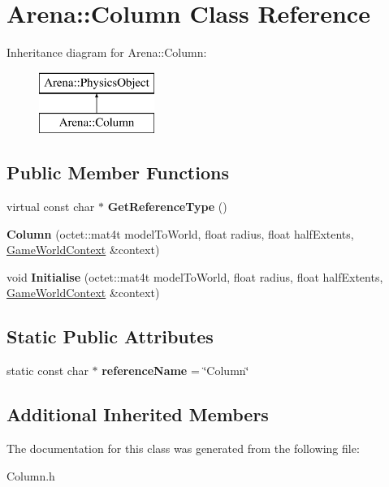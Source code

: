 \hypertarget{class_arena_1_1_column}{\section{Arena\+:\+:Column Class Reference}
\label{class_arena_1_1_column}
}
Inheritance diagram for Arena\+:\+:Column\+:\begin{figure}[H]
\begin{center}
\leavevmode
\includegraphics[height=2.000000cm]{class_arena_1_1_column}
\end{center}
\end{figure}
\subsection*{Public Member Functions}
\begin{DoxyCompactItemize}
\item 
\hypertarget{class_arena_1_1_column_ada6c6ae37547b47f677a1c452ad60acc}{virtual const char $\ast$ {\bfseries Get\+Reference\+Type} ()}\label{class_arena_1_1_column_ada6c6ae37547b47f677a1c452ad60acc}

\item 
\hypertarget{class_arena_1_1_column_a11f7d8799a1daff34f7d4080bbcbddd2}{{\bfseries Column} (octet\+::mat4t model\+To\+World, float radius, float half\+Extents, \hyperlink{struct_arena_1_1_game_world_context}{Game\+World\+Context} \&context)}\label{class_arena_1_1_column_a11f7d8799a1daff34f7d4080bbcbddd2}

\item 
\hypertarget{class_arena_1_1_column_ac0dd8da5448c465e2e1b8ab1d0d21cde}{void {\bfseries Initialise} (octet\+::mat4t model\+To\+World, float radius, float half\+Extents, \hyperlink{struct_arena_1_1_game_world_context}{Game\+World\+Context} \&context)}\label{class_arena_1_1_column_ac0dd8da5448c465e2e1b8ab1d0d21cde}

\end{DoxyCompactItemize}
\subsection*{Static Public Attributes}
\begin{DoxyCompactItemize}
\item 
\hypertarget{class_arena_1_1_column_a9dea60358937d48f40ab12e427173717}{static const char $\ast$ {\bfseries reference\+Name} = \char`\"{}Column\char`\"{}}\label{class_arena_1_1_column_a9dea60358937d48f40ab12e427173717}

\end{DoxyCompactItemize}
\subsection*{Additional Inherited Members}


The documentation for this class was generated from the following file\+:\begin{DoxyCompactItemize}
\item 
Column.\+h\end{DoxyCompactItemize}
